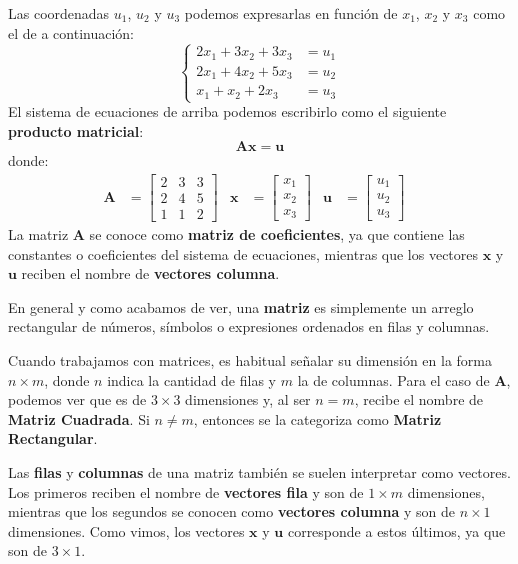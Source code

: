 \documentclass[12pt]{article}
\begin{document}
Las coordenadas $u_{1}$, $u_{2}$ y $u_{3}$ podemos expresarlas en función de $x_{1}$, $x_{2}$ y $x_{3}$ como el de a continuación:
\[
\left\{
\begin{aligned}
2x_{1} + 3x_{2} + 3x_{3} &= u_{1} \\
2x_{1} + 4x_{2} + 5x_{3} &= u_{2} \\
x_{1} + x_{2} + 2x_{3} &= u_{3}
\end{aligned}
\right.
\]
El sistema de ecuaciones de arriba podemos escribirlo como el siguiente \textbf{producto matricial}:
\[
  \mathbf{A}\mathbf{x} = \mathbf{u}
\]
donde:
\begin{align*}
\mathbf{A} &=
\begin{bmatrix}
2 & 3 & 3 \\
2 & 4 & 5 \\
1 & 1 & 2
\end{bmatrix} &
\mathbf{x} &=
\begin{bmatrix}
x_{1} \\ x_{2} \\ x_{3}
\end{bmatrix} &
\mathbf{u} &=
\begin{bmatrix}
u_{1} \\ u_{2} \\ u_{3}
\end{bmatrix} &
\end{align*}
La matriz $\mathbf{A}$ se conoce como \textbf{matriz de coeficientes}, ya que contiene las constantes o coeficientes del sistema de ecuaciones, mientras que los vectores $\mathbf{x}$ y $\mathbf{u}$ reciben el nombre de \textbf{vectores columna}.

En general y como acabamos de ver, una \textbf{matriz} es simplemente un arreglo rectangular de números, símbolos o expresiones ordenados en filas y columnas.

Cuando trabajamos con matrices, es habitual señalar su dimensión en la forma $n \times m$, donde $n$ indica la cantidad de filas y $m$ la de columnas. Para el caso de $\mathbf{A}$, podemos ver que es de $3 \times 3$ dimensiones y, al ser $n = m$, recibe el nombre de \textbf{Matriz Cuadrada}. Si $n \neq m$, entonces se la categoriza como \textbf{Matriz Rectangular}.

Las \textbf{filas} y \textbf{columnas} de una matriz también se suelen interpretar como vectores. Los primeros reciben el nombre de \textbf{vectores fila} y son de $1 \times m$ dimensiones, mientras que los segundos se conocen como \textbf{vectores columna} y son de $n \times 1$ dimensiones. Como vimos, los vectores $\mathbf{x}$ y $\mathbf{u}$ corresponde a estos últimos, ya que son de $3 \times 1$.
\end{document}
